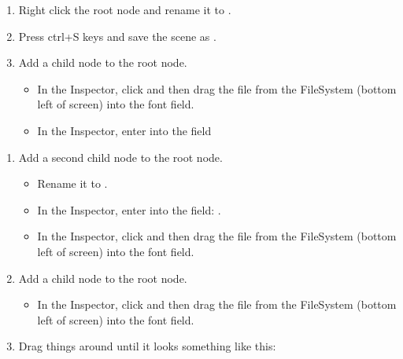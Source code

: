 \documentclass[letterpaper,10pt,english]{sphinxmanual}
\begin{document}
\sphinxAtStartPar
{}
\begin{enumerate}
%
\item {} 
\sphinxAtStartPar
Right click the root node  and rename it to .

\item {} 
\sphinxAtStartPar
Press ctrl+S keys and save the scene as .

\item {} 
\sphinxAtStartPar
Add a  child node to the root node.
\begin{itemize}
\item {} 
\sphinxAtStartPar
In the Inspector, click  and then drag the  file from the
FileSystem (bottom left of screen) into the \sphinxstylestrong{{[}empty{]}} font field.

\item {} 
\sphinxAtStartPar
In the Inspector, enter into the  field

\end{itemize}

\end{enumerate}
\begin{enumerate}
%
\item {} 
\sphinxAtStartPar
Add a second  child node to the root node.
\begin{itemize}
\item {} 
\sphinxAtStartPar
Rename it to .

\item {} 
\sphinxAtStartPar
In the Inspector, enter into the  field: .

\item {} 
\sphinxAtStartPar
In the Inspector, click  and then drag the  file from the
FileSystem (bottom left of screen) into the \sphinxstylestrong{{[}empty{]}}
font field.

\end{itemize}

\item {} 
\sphinxAtStartPar
Add a  child node to the root node.
\begin{itemize}
\item {} 
\sphinxAtStartPar
In the Inspector, click  and then drag the  file from the
FileSystem (bottom left of screen) into the \sphinxstylestrong{{[}empty{]}} font field.

\end{itemize}

\item {} 
\sphinxAtStartPar
Drag things around until it looks something like this:

\end{enumerate}
\end{document}
